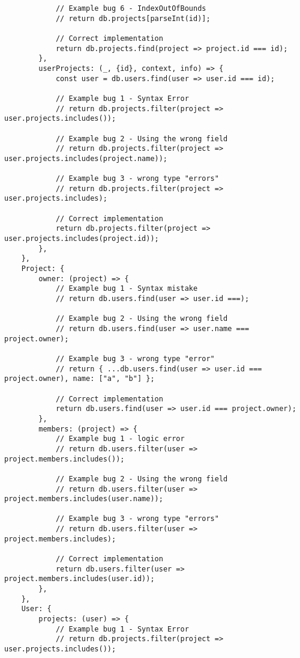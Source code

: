 \begin{lstlisting}
            // Example bug 6 - IndexOutOfBounds
            // return db.projects[parseInt(id)];

            // Correct implementation
            return db.projects.find(project => project.id === id);
        },
        userProjects: (_, {id}, context, info) => {
            const user = db.users.find(user => user.id === id);

            // Example bug 1 - Syntax Error
            // return db.projects.filter(project => user.projects.includes());

            // Example bug 2 - Using the wrong field
            // return db.projects.filter(project => user.projects.includes(project.name));

            // Example bug 3 - wrong type "errors"
            // return db.projects.filter(project => user.projects.includes);

            // Correct implementation
            return db.projects.filter(project => user.projects.includes(project.id));
        },
    },
    Project: {
        owner: (project) => {
            // Example bug 1 - Syntax mistake
            // return db.users.find(user => user.id ===);

            // Example bug 2 - Using the wrong field
            // return db.users.find(user => user.name === project.owner);

            // Example bug 3 - wrong type "error"
            // return { ...db.users.find(user => user.id === project.owner), name: ["a", "b"] };

            // Correct implementation
            return db.users.find(user => user.id === project.owner);
        },
        members: (project) => {
            // Example bug 1 - logic error
            // return db.users.filter(user => project.members.includes());

            // Example bug 2 - Using the wrong field
            // return db.users.filter(user => project.members.includes(user.name));

            // Example bug 3 - wrong type "errors"
            // return db.users.filter(user => project.members.includes);

            // Correct implementation
            return db.users.filter(user => project.members.includes(user.id));
        },
    },
    User: {
        projects: (user) => {
            // Example bug 1 - Syntax Error
            // return db.projects.filter(project => user.projects.includes());


\end{lstlisting}
